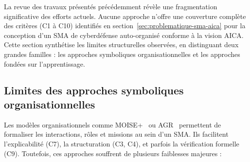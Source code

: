 \documentclass[ twoside,openright,titlepage,numbers=noenddot,headinclude,%
                footinclude=true,cleardoublepage=empty,abstractoff, %
                BCOR=5mm,paper=a4,fontsize=11pt,%
                french,american,%
                ]{scrreprt}
\begin{document}

La revue des travaux présentés précédemment révèle une fragmentation significative des efforts actuels. Aucune approche n'offre une couverture complète des critères (C1 à C10) identifiés en section~\ref{sec:problematique-sma-aica} pour la conception d'un SMA de cyberdéfense auto-organisé conforme à la vision AICA. Cette section synthétise les limites structurelles observées, en distinguant deux grandes familles : les approches symboliques organisationnelles et les approches fondées sur l'apprentissage.

\subsection{Limites des approches symboliques organisationnelles}

Les modèles organisationnels comme MOISE+~\cite{Hubner2002} ou AGR~\cite{Ferber2003} permettent de formaliser les interactions, rôles et missions au sein d'un SMA. Ils facilitent l'explicabilité (C7), la structuration (C3, C4), et parfois la vérification formelle (C9). Toutefois, ces approches souffrent de plusieurs faiblesses majeures :
\end{document}
